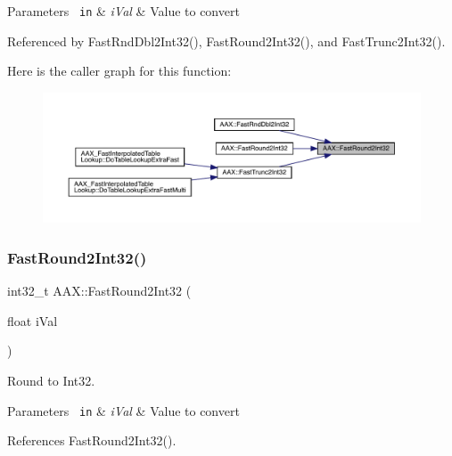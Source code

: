 \begin{DoxyParams}[1]{Parameters}
\mbox{\texttt{ in}}  & {\em i\+Val} & Value to convert \\
\hline
\end{DoxyParams}


Referenced by Fast\+Rnd\+Dbl2\+Int32(), Fast\+Round2\+Int32(), and Fast\+Trunc2\+Int32().

Here is the caller graph for this function\+:
\nopagebreak
\begin{figure}[H]
\begin{center}
\leavevmode
\includegraphics[width=350pt]{a00852_af0bbeabd87aa74be4ecca4f767aedc41_icgraph}
\end{center}
\end{figure}
\mbox{\label{a00852_a56cd923aeae2bd544f1fb43fff6b0b3d}} 
\subsubsection{\texorpdfstring{FastRound2Int32()}{FastRound2Int32()}\hspace{0.1cm}{\footnotesize\ttfamily [2/2]}}
{\footnotesize\ttfamily int32\+\_\+t A\+A\+X\+::\+Fast\+Round2\+Int32 (\begin{DoxyParamCaption}\item[{float}]{i\+Val }\end{DoxyParamCaption})\hspace{0.3cm}{\ttfamily [inline]}}



Round to Int32. 


\begin{DoxyParams}[1]{Parameters}
\mbox{\texttt{ in}}  & {\em i\+Val} & Value to convert \\
\hline
\end{DoxyParams}


References Fast\+Round2\+Int32().

